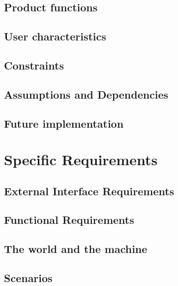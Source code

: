 \documentclass[]{report}
\begin{document}
\section{Product functions}


\section{User characteristics}


\section{Constraints}


\section{Assumptions and Dependencies}


\section{Future implementation}


\chapter{Specific Requirements}

\section{External Interface Requirements}


\section{Functional Requirements}


\section{The world and the machine}


\section{Scenarios}

\end{document}
